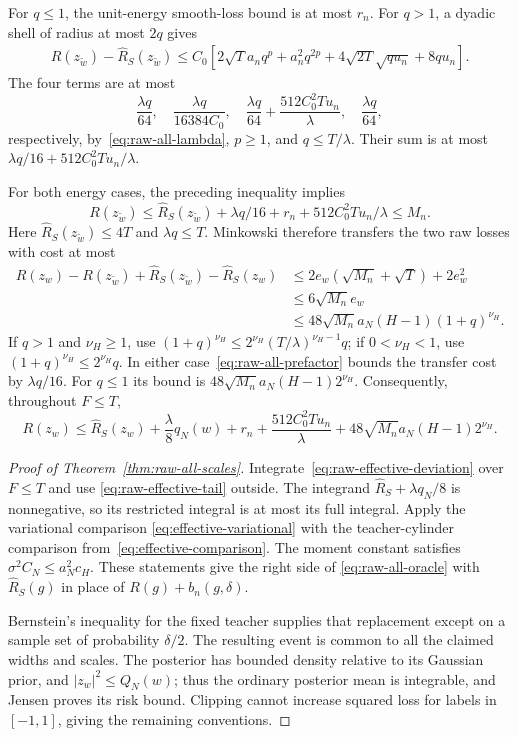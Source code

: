 For $q\leq1$, the unit-energy smooth-loss bound is at most $r_n$.
For $q>1$, a dyadic shell of radius at most $2q$ gives
\begin{align*}
 R(z_{\widetilde w})-\widehat R_S(z_{\widetilde w})
 \leq C_0[2\sqrt T a_nq^p+a_n^2q^{2p}
                  +4\sqrt{2T}\sqrt{qu_n}+8qu_n].
\end{align*}
The four terms are at most
\[
 \frac{\lambda q}{64},\quad
 \frac{\lambda q}{16384C_0},\quad
 \frac{\lambda q}{64}+\frac{512C_0^2Tu_n}{\lambda},\quad
 \frac{\lambda q}{64},
\]
respectively, by~\eqref{eq:raw-all-lambda}, $p\geq1$, and
$q\leq T/\lambda$.  Their sum is at most
$\lambda q/16+512C_0^2Tu_n/\lambda$.

For both energy cases, the preceding inequality implies
\[
 R(z_{\widetilde w})\leq
 \widehat R_S(z_{\widetilde w})+\lambda q/16
             +r_n+512C_0^2Tu_n/\lambda\leq M_n.
\]
Here $\widehat R_S(z_{\widetilde w})\leq4T$ and $\lambda q\leq T$.
Minkowski therefore transfers the two raw losses with cost at most
\begin{align*}
 R(z_w)-R(z_{\widetilde w})
  +\widehat R_S(z_{\widetilde w})-\widehat R_S(z_w)
 &\leq2e_w(\sqrt{M_n}+\sqrt T)+2e_w^2\\
 &\leq6\sqrt{M_n}e_w\\
 &\leq48\sqrt{M_n}a_N(H-1)(1+q)^{\nu_H}.
\end{align*}
If $q>1$ and $\nu_H\geq1$, use
$(1+q)^{\nu_H}\leq2^{\nu_H}(T/\lambda)^{\nu_H-1}q$;
if $0<\nu_H<1$, use $(1+q)^{\nu_H}\leq2^{\nu_H}q$.
In either case~\eqref{eq:raw-all-prefactor} bounds the transfer cost
by $\lambda q/16$.  For $q\leq1$ its bound is
$48\sqrt{M_n}a_N(H-1)2^{\nu_H}$.
Consequently, throughout $F\leq T$,
\begin{equation}
 R(z_w)\leq\widehat R_S(z_w)+\frac\lambda8 q_N(w)
       +r_n+\frac{512C_0^2Tu_n}{\lambda}
       +48\sqrt{M_n}a_N(H-1)2^{\nu_H}.
 \label{eq:raw-effective-deviation}
\end{equation}

\begin{proof}[Proof of Theorem~\ref{thm:raw-all-scales}]
Integrate~\eqref{eq:raw-effective-deviation} over $F\leq T$ and use
\eqref{eq:raw-effective-tail} outside.  The integrand
$\widehat R_S+\lambda q_N/8$ is nonnegative, so its restricted integral
is at most its full integral.  Apply the variational comparison
\eqref{eq:effective-variational} with the teacher-cylinder comparison
from~\eqref{eq:effective-comparison}.  The moment constant satisfies
$\sigma^2C_N\leq a_N^2c_H$.  These statements give the right side of
\eqref{eq:raw-all-oracle} with $\widehat R_S(g)$ in place of
$R(g)+b_n(g,\delta)$.

Bernstein's inequality for the fixed teacher supplies that replacement
except on a sample set of probability $\delta/2$.  The resulting event
is common to all the claimed widths and scales.  The posterior has
bounded density relative to its Gaussian prior, and
$|z_w|^2\leq Q_N(w)$; thus the ordinary posterior mean is integrable,
and Jensen proves its risk bound.  Clipping cannot increase squared
loss for labels in $[-1,1]$, giving the remaining conventions.
\end{proof}

